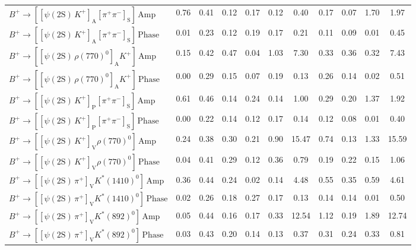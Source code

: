 \begin{tabular}{l  c  c  c  c  c  c  c  c  c  | c }
$B^{+}\rightarrow \left[\left[\psi(\text{2S})\,K^{+}\right]_{\text{A}}\left[\pi^{+}\pi^{-}\right]_{\text{S}}\right]\,\text{Amp}$ & 0.76 & 0.41 & 0.12 & 0.17 & 0.12 & 0.40 & 0.17 & 0.07 & 1.70 & 1.97 \\ 
$B^{+}\rightarrow \left[\left[\psi(\text{2S})\,K^{+}\right]_{\text{A}}\left[\pi^{+}\pi^{-}\right]_{\text{S}}\right]\,\text{Phase}$ & 0.01 & 0.23 & 0.12 & 0.19 & 0.17 & 0.21 & 0.11 & 0.09 & 0.01 & 0.45 \\ 
$B^{+}\rightarrow \left[\left[\psi(\text{2S})\,\rho(770)^{0}\right]_{\text{A}}K^{+}\right]\,\text{Amp}$ & 0.15 & 0.42 & 0.47 & 0.04 & 1.03 & 7.30 & 0.33 & 0.36 & 0.32 & 7.43 \\ 
$B^{+}\rightarrow \left[\left[\psi(\text{2S})\,\rho(770)^{0}\right]_{\text{A}}K^{+}\right]\,\text{Phase}$ & 0.00 & 0.29 & 0.15 & 0.07 & 0.19 & 0.13 & 0.26 & 0.14 & 0.02 & 0.51 \\ 
$B^{+}\rightarrow \left[\left[\psi(\text{2S})\,K^{+}\right]_{\text{P}}\left[\pi^{+}\pi^{-}\right]_{\text{S}}\right]\,\text{Amp}$ & 0.61 & 0.46 & 0.14 & 0.24 & 0.14 & 1.00 & 0.29 & 0.20 & 1.37 & 1.92 \\ 
$B^{+}\rightarrow \left[\left[\psi(\text{2S})\,K^{+}\right]_{\text{P}}\left[\pi^{+}\pi^{-}\right]_{\text{S}}\right]\,\text{Phase}$ & 0.00 & 0.22 & 0.14 & 0.12 & 0.17 & 0.14 & 0.12 & 0.08 & 0.01 & 0.40 \\ 
$B^{+}\rightarrow \left[\left[\psi(\text{2S})\,K^{+}\right]_{\text{V}}\rho(770)^{0}\right]\,\text{Amp}$ & 0.24 & 0.38 & 0.30 & 0.21 & 0.90 & 15.47 & 0.74 & 0.13 & 1.33 & 15.59 \\ 
$B^{+}\rightarrow \left[\left[\psi(\text{2S})\,K^{+}\right]_{\text{V}}\rho(770)^{0}\right]\,\text{Phase}$ & 0.04 & 0.41 & 0.29 & 0.12 & 0.36 & 0.79 & 0.19 & 0.22 & 0.15 & 1.06 \\ 
$B^{+}\rightarrow \left[\left[\psi(\text{2S})\,\pi^{+}\right]_{\text{V}}K^{*}(1410)^{0}\right]\,\text{Amp}$ & 0.36 & 0.44 & 0.24 & 0.02 & 0.14 & 4.48 & 0.55 & 0.35 & 0.59 & 4.61 \\ 
$B^{+}\rightarrow \left[\left[\psi(\text{2S})\,\pi^{+}\right]_{\text{V}}K^{*}(1410)^{0}\right]\,\text{Phase}$ & 0.02 & 0.26 & 0.18 & 0.27 & 0.17 & 0.13 & 0.14 & 0.14 & 0.01 & 0.50 \\ 
$B^{+}\rightarrow \left[\left[\psi(\text{2S})\,\pi^{+}\right]_{\text{V}}K^{*}(892)^{0}\right]\,\text{Amp}$ & 0.05 & 0.44 & 0.16 & 0.17 & 0.33 & 12.54 & 1.12 & 0.19 & 1.89 & 12.74 \\ 
$B^{+}\rightarrow \left[\left[\psi(\text{2S})\,\pi^{+}\right]_{\text{V}}K^{*}(892)^{0}\right]\,\text{Phase}$ & 0.03 & 0.43 & 0.20 & 0.14 & 0.13 & 0.37 & 0.31 & 0.24 & 0.33 & 0.81 \\ 

\end{tabular}

